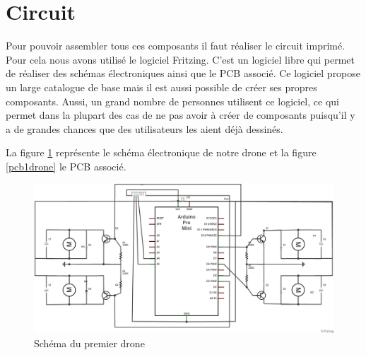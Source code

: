 \documentclass[a4paper,10pt]{report}
\begin{document}
    \section{Circuit}
      Pour pouvoir assembler tous ces composants il faut réaliser le circuit imprimé. Pour cela nous avons utilisé le logiciel Fritzing.
      C'est un logiciel libre qui permet de réaliser des schémas électroniques ainsi que le PCB associé. Ce logiciel propose un large
      catalogue de base mais il est aussi possible de créer ses propres composants. Aussi, un grand nombre de personnes utilisent ce
      logiciel, ce qui permet dans la plupart des cas de ne pas avoir à créer de composants puisqu'il y a de grandes chances que des
      utilisateurs les aient déjà dessinés.
      
      La figure \ref{schema1drone} représente le schéma électronique de notre drone et la figure \ref{pcb1drone} le PCB associé.
      
      \begin{figure}[htbp]%
	\centering
	\includegraphics[scale = 0.3]{img/drone1_circuit_schema.png}
	\caption{Schéma du premier drone}
	\label{schema1drone}
      \end{figure}
      
\end{document}
